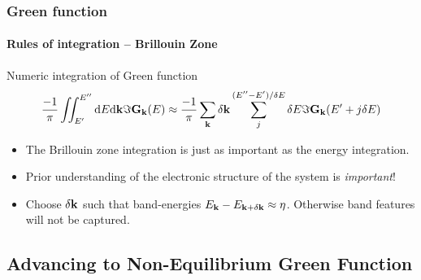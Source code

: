\begin{frame}
  \frametitle{Green function}
  \framesubtitle{Rules of integration -- Brillouin Zone}


  \begin{block}{Numeric integration of Green function}
    \small 
    \begin{equation*}
      \frac{-1}\pi\iint_{E'}^{E''} \mathrm{d} E\mathrm{d} \mathbf{k}\Im \mathbf{G}_{\mathbf{k}}(E) \approx \frac{-1}\pi
      \sum_{\mathbf{k}}\delta\mathbf{k}\sum_j^{(E''-E')/\delta E} \delta E \Im \mathbf{G}_{\mathbf{k}}(E'+j\delta E)
    \end{equation*}

    \begin{itemize}
      \item%
      The Brillouin zone integration is just as important as the energy integration.

      \item%
      Prior understanding of the electronic structure of the system is \emph{important}! 

      \item<2->%
      Choose $\delta\mathbf{k}$ such that band-energies $E_{\mathbf{k}} -
      E_{\mathbf{k}+\delta\mathbf{k}}\approx \eta$. Otherwise band features will not be captured.
      
    \end{itemize}
    
  \end{block}

\end{frame}


\subsection{Advancing to Non-Equilibrium Green Function}


